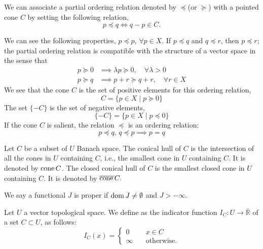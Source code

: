 \begin{remark}
	We can associate a partial ordering relation denoted by $\preceq$(or $\succeq$) with a pointed cone $C$ by setting the following relation,
	\[
	 p \preceq q \iff q - p \in C.
	\]

	We can see the following properties, $p \preceq p$, $\forall p \in X$. If $p \preceq q $ and $q \preceq r$, then $p\preceq r$; the partial ordering relation is compatible with the structure of a vector space in the sense that
	\begin{align*}
		p \succeq 0 &\implies \lambda p \succeq 0, \quad \forall \lambda > 0 \\
		p \succeq q &\implies p+r \succeq q+r, \quad \forall r \in X		
	\end{align*}
	We see that the cone $C$ is the set of positive elements for this ordering relation,
	\[
		C = \{ p \in X \mid p \succeq 0\}
	\]
	The set $\{-C\}$ is the set of negative elements,
	\[
		\{-C\}=\{p \in X \mid p \preceq 0\}
	\]
	If the cone $C$ is salient, the relation $\preceq$ is an ordering relation:
	\[
		p\preceq q,\, q \preceq p \implies p = q
	\]
\end{remark}
\begin{definition}
	Let $C$ be a subset of $U$ Banach space. The conical hull of $C$ is the intersection of all the cones in $U$ containing $C$, i.e., the smallest cone in $U$ containing $C$. It is denoted by $\mathrm{cone\,} C$. The closed conical hull of $C$ is the smallest closed cone in $U$ containing $C$. It is denoted by $\overline{\mathrm{cone\,}} C.$
\end{definition}

\begin{definition}
	We say a functional $J$ is proper if $\mathrm{dom\,} J \neq \emptyset$ and $J>-\infty$.
\end{definition}

\begin{definition}
	Let $U$ a vector topological space. We define as the indicator function $I_C:U\rightarrow \overline{\mathbb{R}}$ of a set $C \subset U$, as follows:
	\begin{equation*}
		I_C(x)=\left\lbrace
		\begin{array}{ll}
		0	&\quad x \in C \\
		\infty &\quad \text{otherwise.}
		\end{array}
		\right.
	\end{equation*}
\end{definition}

